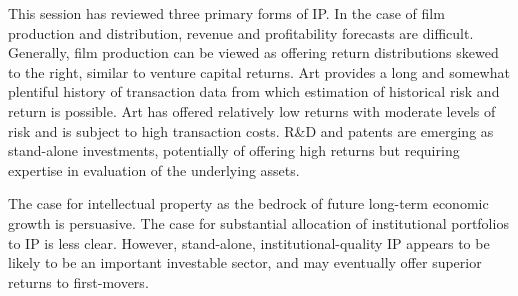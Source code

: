 \documentclass[11pt]{article}
\begin{document}
This session has reviewed three primary forms of IP. In the case of film production and distribution, revenue and profitability forecasts are difficult. Generally, film production can be viewed as offering return distributions skewed to the right, similar to venture capital returns. Art provides a long and somewhat plentiful history of transaction data from which estimation of historical risk and return is possible. Art has offered relatively low returns with moderate levels of risk and is subject to high transaction costs. R\&D and patents are emerging as stand-alone investments, potentially of offering high returns but requiring expertise in evaluation of the underlying assets.

The case for intellectual property as the bedrock of future long-term economic growth is persuasive. The case for substantial allocation of institutional portfolios to IP is less clear. However, stand-alone, institutional-quality IP appears to be likely to be an important investable sector, and may eventually offer superior returns to first-movers.
\end{document}
